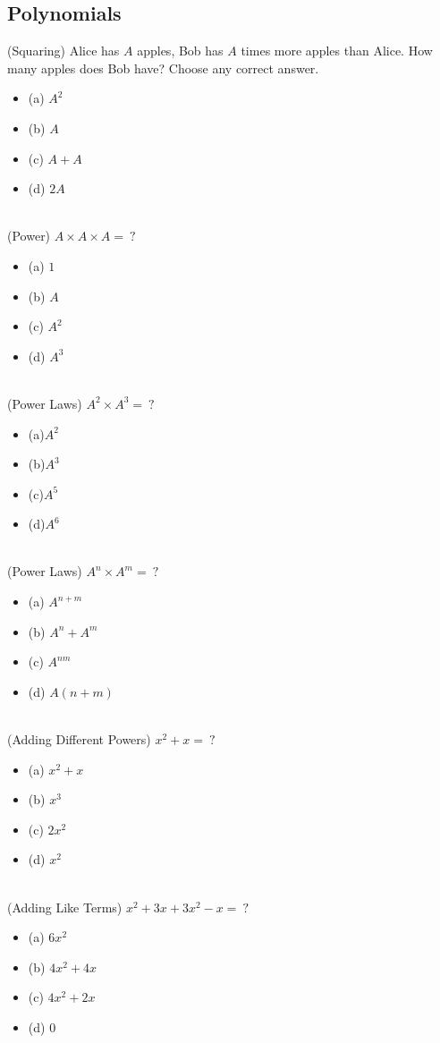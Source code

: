 \documentclass{article}
\begin{document}
\subsection{Polynomials}
(Squaring) Alice has $A$ apples, Bob has $A$ times more apples than Alice. How many apples does Bob have? Choose any correct answer.
\begin{itemize}
\item[] (a) $A^2$
\item[] (b) $A$
\item[] (c) $A+A$
\item[] (d) $2A$
\end{itemize} \hrulefill \\[10pt]
(Power) $A\times A \times A = \ ?$
\begin{itemize}
\item[](a) $1$
\item[](b) $A$
\item[](c) $A^2$
\item[](d) $A^3$
\end{itemize} \hrulefill \\[10pt]
(Power Laws) $A^2 \times A^3 = \ ?$
\begin{itemize}
\item[] (a)$A^2$
\item[] (b)$A^3$
\item[] (c)$A^5$
\item[] (d)$A^6$
\end{itemize} \hrulefill \\[10pt]
(Power Laws) $A^n \times A^m = \ ?$
\begin{itemize}
\item[] (a) $A^{n+m}$
\item[] (b) $A^n + A^m$
\item[] (c) $A^{nm}$
\item[] (d) $A(n+m)$
\end{itemize} \hrulefill \\[10pt]
\newpage
\noindent (Adding Different Powers) $x^2 + x = \ ?$
\begin{itemize}
\item[] (a) $x^2 + x $
\item[] (b) $x^3$
\item[] (c) $2x^2$
\item[] (d) $x^2$
\end{itemize} \hrulefill \\[10pt]
(Adding Like Terms) $x^2 + 3x + 3x^2 - x = \ ?$
\begin{itemize}
\item[] (a) $6x^2$ 
\item[] (b) $4x^2 + 4x$
\item[] (c) $4x^2 + 2x$
\item[] (d) $0$
\end{itemize} \hrulefill \\[10pt]
\end{document}
